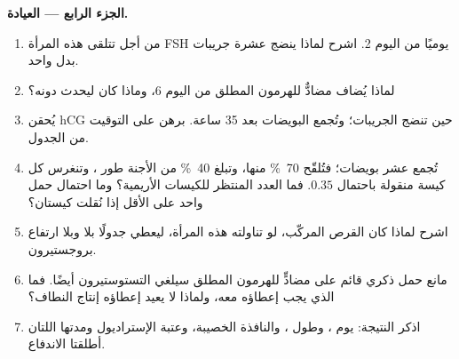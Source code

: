 \begin{problem}
\medskip
\noindent\textbf{الجزء الرابع --- العيادة.}
\begin{enumerate}[resume]
  \item من أجل  تتلقى هذه المرأة FSH يوميًا
        من اليوم 2. اشرح لماذا ينضج عشرة جريبات بدل واحد.
  \item لماذا يُضاف مضادٌّ للهرمون المطلق من اليوم 6، وماذا كان
        ليحدث دونه؟
  \item يُحقن hCG حين تنضج الجريبات؛ وتُجمع البويضات
        بعد 35 ساعة. برهن على التوقيت من الجدول.
  \item تُجمع عشر بويضات؛ فتُلقّح \qty{70}{\%} منها، وتبلغ
        \qty{40}{\%} من الأجنة طور ، وتنغرس كل
        كيسة منقولة باحتمال $0.35$.
        فما العدد المنتظر للكيسات الأريمية؟ وما احتمال حمل واحد
        على الأقل إذا نُقلت كيستان؟
  \item اشرح لماذا كان القرص المركّب، لو تناولته هذه المرأة،
        ليعطي جدولًا بلا  وبلا ارتفاع بروجستيرون.
  \item مانع حمل ذكري قائم على مضادٍّ للهرمون المطلق سيلغي
        التستوستيرون أيضًا. فما الذي يجب إعطاؤه معه، ولماذا
        لا يعيد إعطاؤه إنتاج النطاف؟
  \item اذكر النتيجة: يوم ، وطول ، والنافذة
        الخصيبة، وعتبة الإستراديول ومدتها اللتان أطلقتا الاندفاع.
\end{enumerate}
\end{problem}
